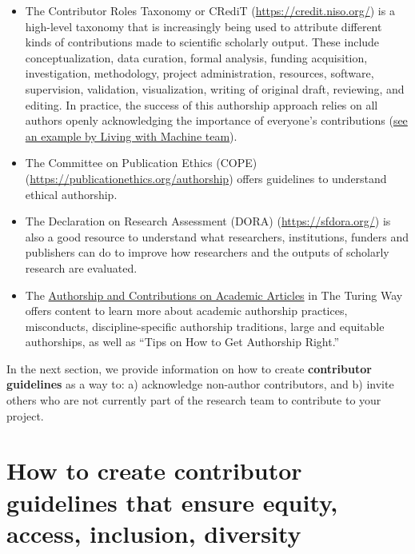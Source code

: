 \documentclass[
  letterpaper,
  DIV=11,
  numbers=noendperiod]{scrreport}
\providecommand{\tightlist}{%
  \setlength{\itemsep}{0pt}\setlength{\parskip}{0pt}}\usepackage{longtable,booktabs,array}
\begin{document}
\begin{itemize}
\tightlist
\item
  The Contributor Roles Taxonomy or CRediT
  (\url{https://credit.niso.org/}) is a high-level taxonomy that is
  increasingly being used to attribute different kinds of contributions
  made to scientific scholarly output. These include
  \hspace{0pt}\hspace{0pt}\hspace{0pt}\hspace{0pt}conceptualization,
  data curation, formal analysis, funding acquisition, investigation,
  methodology, project administration, resources, software, supervision,
  validation, visualization, writing of original draft, reviewing, and
  editing. In practice, the success of this authorship approach relies
  on all authors openly acknowledging the importance of everyone's
  contributions
  (\href{https://livingwithmachines.ac.uk/highlighting-authors-contributions-and-interdisciplinary-collaborations-in-living-with-machines}{see
  an example by Living with Machine team}).
\item
  The Committee on Publication Ethics (COPE)
  (\url{https://publicationethics.org/authorship}) offers guidelines to
  understand ethical authorship.
\item
  The Declaration on Research Assessment (DORA)
  (\url{https://sfdora.org/}) is also a good resource to understand what
  researchers, institutions, funders and publishers can do to improve
  how researchers and the outputs of scholarly research are evaluated.
\item
  The
  \href{https://the-turing-way.netlify.app/communication/aa.html\#}{Authorship
  and Contributions on Academic Articles} in The Turing Way offers
  content to learn more about academic authorship practices,
  misconducts, discipline-specific authorship traditions, large and
  equitable authorships, as well as ``\hspace{0pt}\hspace{0pt}Tips on
  How to Get Authorship Right.''
\end{itemize}

In the next section, we provide information on how to create
\textbf{contributor guidelines} as a way to: a) acknowledge non-author
contributors, and b) invite others who are not currently part of the
research team to contribute to your project.

\hypertarget{how-to-create-contributor-guidelines-that-ensure-equity-access-inclusion-diversity}{%
\section{How to create contributor guidelines that ensure equity,
access, inclusion,
diversity}\label{how-to-create-contributor-guidelines-that-ensure-equity-access-inclusion-diversity}}
\end{document}

